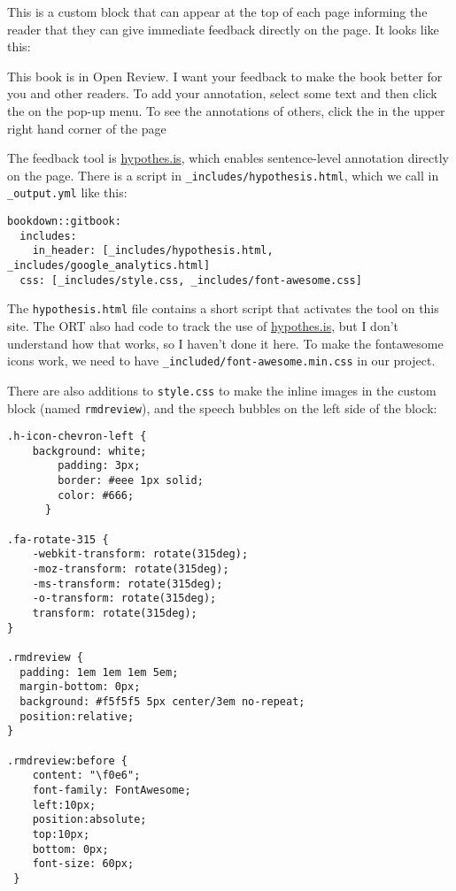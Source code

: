 \documentclass[]{book}
\let\BeginKnitrBlock\begin \let\EndKnitrBlock\end
\begin{document}
This is a custom block that can appear at the top of each page informing
the reader that they can give immediate feedback directly on the page.
It looks like this:

\BeginKnitrBlock{rmdreview}
This book is in Open Review. I want your feedback to make the book
better for you and other readers. To add your annotation, {select some
text} and then click the on the pop-up menu. To see the annotations of
others, click the in the upper right hand corner of the page
\EndKnitrBlock{rmdreview}

The feedback tool is \href{https://hypothes.is/}{hypothes.is}, which
enables sentence-level annotation directly on the page. There is a
script in \texttt{\_includes/hypothesis.html}, which we call in
\texttt{\_output.yml} like this:

\begin{verbatim}
bookdown::gitbook:
  includes:
    in_header: [_includes/hypothesis.html, _includes/google_analytics.html]
  css: [_includes/style.css, _includes/font-awesome.css]
\end{verbatim}

The \texttt{hypothesis.html} file contains a short script that activates
the tool on this site. The ORT also had code to track the use of
\href{https://hypothes.is/}{hypothes.is}, but I don't understand how
that works, so I haven't done it here. To make the fontawesome icons
work, we need to have \texttt{\_included/font-awesome.min.css} in our
project.

There are also additions to \texttt{style.css} to make the inline images
in the custom block (named \texttt{rmdreview}), and the speech bubbles
on the left side of the block:

\begin{verbatim}
.h-icon-chevron-left {
    background: white;
        padding: 3px;
        border: #eee 1px solid;
        color: #666;
      }

.fa-rotate-315 {
    -webkit-transform: rotate(315deg);
    -moz-transform: rotate(315deg);
    -ms-transform: rotate(315deg);
    -o-transform: rotate(315deg);
    transform: rotate(315deg);
}

.rmdreview {
  padding: 1em 1em 1em 5em;
  margin-bottom: 0px;
  background: #f5f5f5 5px center/3em no-repeat;
  position:relative;
}

.rmdreview:before {
    content: "\f0e6";
    font-family: FontAwesome;
    left:10px;
    position:absolute;
    top:10px;
    bottom: 0px;
    font-size: 60px;
 }
\end{verbatim}
\end{document}
